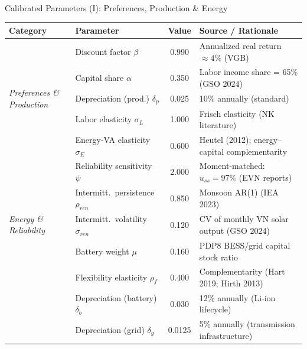 \documentclass[aspectratio=169,10pt]{beamer}
\begin{document}
\begin{frame}{Calibrated Parameters (I): Preferences, Production \& Energy}
	\begin{center}
		\small
		\renewcommand{\arraystretch}{1.25}
		\begin{tabular}{@{}llcl@{}}
			\toprule
			\textbf{Category} & \textbf{Parameter} & \textbf{Value} & \textbf{Source / Rationale}\\
			\midrule
			\multirow{5}{*}{\textit{Preferences \& Production}}
			& Discount factor $\beta$          & 0.990 & Annualized real return $\approx4\%$ (VGB)\\
			& Capital share $\alpha$           & 0.350 & Labor income share = 65\% (GSO 2024)\\
			& Depreciation (prod.) $\delta_p$  & 0.025 & 10\% annually (standard)\\
			& Labor elasticity $\sigma_L$      & 1.000 & Frisch elasticity (NK literature)\\
			& Energy-VA elasticity $\sigma_E$  & 0.600 & Heutel (2012); energy--capital complementarity\\
			\midrule
			\multirow{5}{*}{\textit{Energy \& Reliability}}
			& Reliability sensitivity $\psi$   & 2.000 & Moment-matched: $u_{ss}=97\%$ (EVN reports)\\
			& Intermitt.\ persistence $\rho_{ren}$ & 0.850 & Monsoon AR(1) (IEA 2023)\\
			& Intermitt.\ volatility $\sigma_{ren}$ & 0.120 & CV of monthly VN solar output (GSO 2024)\\
			& Battery weight $\mu$             & 0.160 & PDP8 BESS/grid capital stock ratio\\
			& Flexibility elasticity $\rho_f$  & 0.400 & Complementarity (Hart 2019; Hirth 2013)\\
			\midrule
			& Depreciation (battery) $\delta_b$ & 0.030 & 12\% annually (Li-ion lifecycle)\\
			& Depreciation (grid) $\delta_g$   & 0.0125 & 5\% annually (transmission infrastructure)\\
			\bottomrule
		\end{tabular}
	\end{center}
\end{frame}
\end{document}
